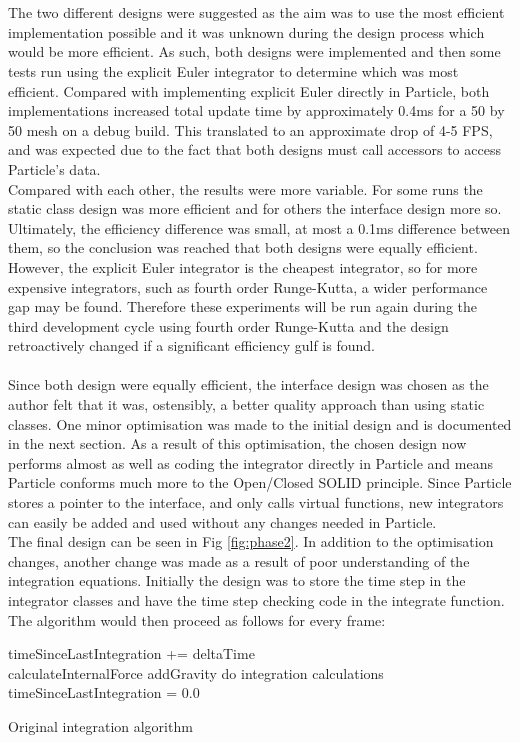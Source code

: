 \\\\The two different designs were suggested as the aim was to use the most efficient implementation possible and it was unknown during the design process which would be more efficient. As such, both designs were implemented and then some tests run using the explicit Euler integrator to determine which was most efficient. Compared with implementing explicit Euler directly in Particle, both implementations increased total update time by approximately 0.4ms for a 50 by 50 mesh on a debug build. This translated to an approximate drop of 4-5 FPS, and was expected due to the fact that both designs must call accessors to access Particle's data.
\\Compared with each other, the results were more variable. For some runs the static class design was more efficient and for others the interface design more so. Ultimately, the efficiency difference was small, at most a 0.1ms difference between them, so the conclusion was reached that both designs were equally efficient. However, the explicit Euler integrator is the cheapest integrator, so for more expensive integrators, such as fourth order Runge-Kutta, a wider performance gap may be found. Therefore these experiments will be run again during the third development cycle using fourth order Runge-Kutta and the design retroactively changed if a significant efficiency gulf is found.
\\\\Since both design were equally efficient, the interface design was chosen as the author felt that it was, ostensibly, a better quality approach than using static classes. One minor optimisation was made to the initial design and is documented in the next section. As a result of this optimisation, the chosen design now performs almost as well as coding the integrator directly in Particle and means Particle conforms much more to the Open/Closed SOLID principle. Since Particle stores a pointer to the interface, and only calls virtual functions, new integrators can easily be added and used without any changes needed in Particle. 
\\The final design can be seen in Fig \ref{fig:phase2}. In addition to the optimisation changes, another change was made as a result of poor understanding of the integration equations. Initially the design was to store the time step in the integrator classes and have the time step checking code in the integrate function. The algorithm would then proceed as follows for every frame:
\begin{algorithm}[h]
  \SetAlgoLined
  \SetNoFillComment
  timeSinceLastIntegration += deltaTime
  \\ {
    calculateInternalForce
  }
   {
    addGravity
  }
   {
     {
      do integration calculations
    }
    timeSinceLastIntegration = 0.0
  }
  \caption{Original integration algorithm}
\end{algorithm}
